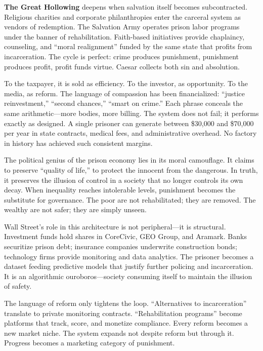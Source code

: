 \documentclass[11pt,twoside]{book}
\begin{document}
\textbf{The Great Hollowing} deepens when salvation itself becomes subcontracted.  
Religious charities and corporate philanthropies enter the carceral system as vendors of redemption.  
The Salvation Army operates prison labor programs under the banner of rehabilitation.  
Faith-based initiatives provide chaplaincy, counseling, and “moral realignment” funded by the same state that profits from incarceration.  
The cycle is perfect: crime produces punishment, punishment produces profit, profit funds virtue.  
Caesar collects both sin and absolution.

To the taxpayer, it is sold as efficiency.  
To the investor, as opportunity.  
To the media, as reform.  
The language of compassion has been financialized: “justice reinvestment,” “second chances,” “smart on crime.”  
Each phrase conceals the same arithmetic—more bodies, more billing.  
The system does not fail; it performs exactly as designed.  
A single prisoner can generate between \$30,000 and \$70,000 per year in state contracts, medical fees, and administrative overhead.  
No factory in history has achieved such consistent margins.

The political genius of the prison economy lies in its moral camouflage.  
It claims to preserve “quality of life,” to protect the innocent from the dangerous.  
In truth, it preserves the illusion of control in a society that no longer controls its own decay.  
When inequality reaches intolerable levels, punishment becomes the substitute for governance.  
The poor are not rehabilitated; they are removed.  
The wealthy are not safer; they are simply unseen.

Wall Street’s role in this architecture is not peripheral—it is structural.  
Investment funds hold shares in CoreCivic, GEO Group, and Aramark.  
Banks securitize prison debt; insurance companies underwrite construction bonds; technology firms provide monitoring and data analytics.  
The prisoner becomes a dataset feeding predictive models that justify further policing and incarceration.  
It is an algorithmic ouroboros—society consuming itself to maintain the illusion of safety.

The language of reform only tightens the loop.  
“Alternatives to incarceration” translate to private monitoring contracts.  
“Rehabilitation programs” become platforms that track, score, and monetize compliance.  
Every reform becomes a new market niche.  
The system expands not despite reform but through it.  
Progress becomes a marketing category of punishment.
\end{document}
